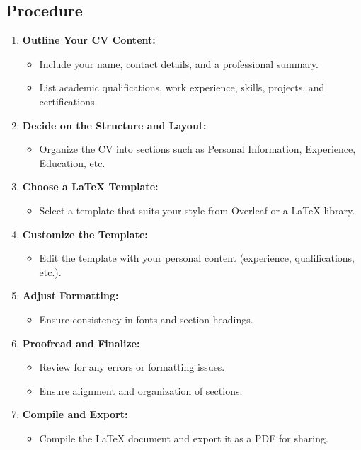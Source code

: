 \documentclass[a4paper,12pt]{article}
\begin{document}
\subsection*{Procedure}
\begin{enumerate}
    \item \textbf{Outline Your CV Content:}
    \begin{itemize}
        \item Include your name, contact details, and a professional summary.
        \item List academic qualifications, work experience, skills, projects, and certifications.
    \end{itemize}

    \item \textbf{Decide on the Structure and Layout:}
    \begin{itemize}
        \item Organize the CV into sections such as Personal Information, Experience, Education, etc.
    \end{itemize}

    \item \textbf{Choose a LaTeX Template:}
    \begin{itemize}
        \item Select a template that suits your style from Overleaf or a LaTeX library.
    \end{itemize}

    \item \textbf{Customize the Template:}
    \begin{itemize}
        \item Edit the template with your personal content (experience, qualifications, etc.).
    \end{itemize}

    \item \textbf{Adjust Formatting:}
    \begin{itemize}
        \item Ensure consistency in fonts and section headings.
    \end{itemize}

    \item \textbf{Proofread and Finalize:}
    \begin{itemize}
        \item Review for any errors or formatting issues.
        \item Ensure alignment and organization of sections.
    \end{itemize}

    \item \textbf{Compile and Export:}
    \begin{itemize}
        \item Compile the LaTeX document and export it as a PDF for sharing.
    \end{itemize}
\end{enumerate}
\end{document}
